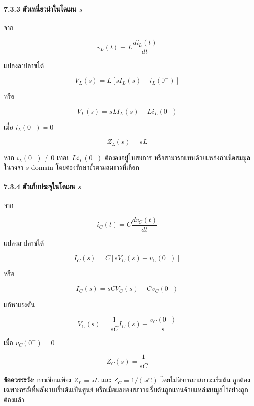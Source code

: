 \paragraph{7.3.3 ตัวเหนี่ยวนำในโดเมน $s$}

จาก

\[
v_L(t)=L\frac{di_L(t)}{dt}
\]

แปลงลาปลาซได้

\[
V_L(s)=L\left[sI_L(s)-i_L(0^-)\right]
\]

หรือ

\[
V_L(s)=sLI_L(s)-Li_L(0^-)
\]

เมื่อ $i_L(0^-)=0$

\[
Z_L(s)=sL
\]

หาก $i_L(0^-)\neq0$ เทอม $Li_L(0^-)$ ต้องคงอยู่ในสมการ หรือสามารถแทนด้วยแหล่งกำเนิดสมมูลในวงจร $s$-domain โดยต้องรักษาขั้วตามสมการที่เลือก

\paragraph{7.3.4 ตัวเก็บประจุในโดเมน $s$}

จาก

\[
i_C(t)=C\frac{dv_C(t)}{dt}
\]

แปลงลาปลาซได้

\[
I_C(s)=C\left[sV_C(s)-v_C(0^-)\right]
\]

หรือ

\[
I_C(s)=sCV_C(s)-Cv_C(0^-)
\]

แก้หาแรงดัน

\[
V_C(s)=\frac{1}{sC}I_C(s)+\frac{v_C(0^-)}{s}
\]

เมื่อ $v_C(0^-)=0$

\[
Z_C(s)=\frac{1}{sC}
\]

\textbf{ข้อควรระวัง:} การเขียนเพียง $Z_L=sL$ และ $Z_C=1/(sC)$ โดยไม่พิจารณาสภาวะเริ่มต้น ถูกต้องเฉพาะกรณีที่พลังงานเริ่มต้นเป็นศูนย์ หรือเมื่อผลของสภาวะเริ่มต้นถูกแทนด้วยแหล่งสมมูลไว้อย่างถูกต้องแล้ว

